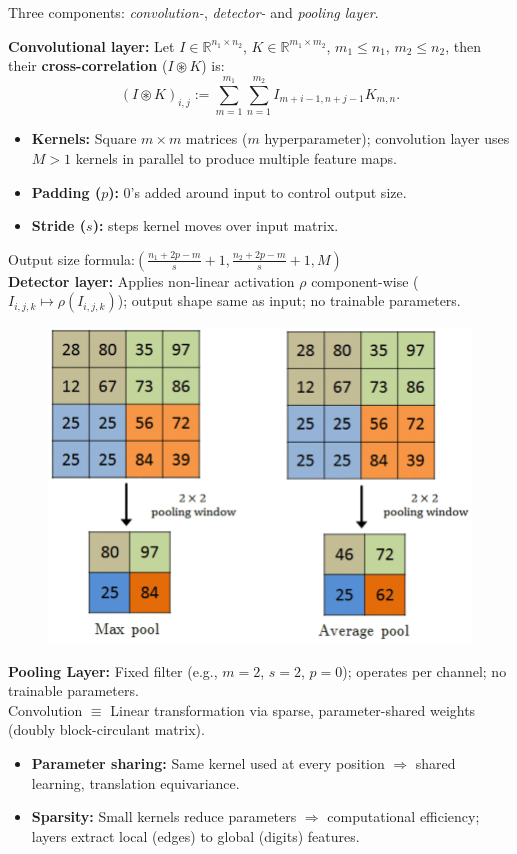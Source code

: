 \documentclass[a4paper,10pt]{article}
\newenvironment{myitemize}
{\vspace{-0.25cm}\begin{itemize}}
{\end{itemize}}
\begin{document}
\begin{small}
Three components: \textit{convolution-}, \textit{detector-} and \textit{pooling layer}.

\textbf{Convolutional layer:} Let $I \in \mathbb{R}^{n_1 \times n_2}$, $K \in \mathbb{R}^{m_1 \times m_2}$, $m_1 \leq n_1$, $m_2 \leq n_2$, then their \textbf{cross-correlation} ($I \circledast K$) is:
$$
(I \circledast K)_{i,j} := \sum_{m=1}^{m_1} \sum_{n=1}^{m_2} I_{m+i-1, n+j-1} K_{m, n}.
$$

\begin{myitemize}
    \item \textbf{Kernels:} Square $m \times m$ matrices ($m$ hyperparameter); convolution layer uses $M > 1$ kernels in parallel to produce multiple feature maps.
    \item \textbf{Padding ($p$):} 0's added around input to control output size.
    \item \textbf{Stride ($s$):} steps kernel moves over input matrix.
\end{myitemize}

Output size formula:$\left( \frac{n_1 + 2p - m}{s} + 1, \frac{n_2 + 2p - m}{s} + 1, M \right)$ \\

\textbf{Detector layer:}
Applies non-linear activation $\rho$ component-wise ($I_{i,j,k} \mapsto \rho(I_{i,j,k})$); output shape same as input; no trainable parameters.

\begin{figure}
    \centering
    \vspace{-25pt}
    \includegraphics[width=0.27\columnwidth]{figures/Visual-representation-of-pooling-operations-a-max-pooling-b-average-pooling}
    \vspace{-20pt}
\end{figure}

\textbf{Pooling Layer:} Fixed filter (e.g., $m=2$, $s=2$, $p=0$); operates per channel; no trainable parameters.
\\

Convolution $\equiv$ Linear transformation via sparse, parameter-shared weights (doubly block-circulant matrix).

\begin{myitemize}
    \item \textbf{Parameter sharing:} Same kernel used at every position $\Rightarrow$ shared learning, translation equivariance.
    \item \textbf{Sparsity:} Small kernels reduce parameters $\Rightarrow$ computational efficiency; layers extract local (edges) to global (digits) features.
\end{myitemize}


\end{small}
\end{document}
